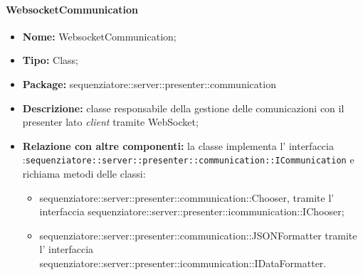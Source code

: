 \paragraph{WebsocketCommunication}
	\begin{itemize}
		\item \textbf{Nome:} WebsocketCommunication;
		\item \textbf{Tipo:} Class;
		\item \textbf{Package:} sequenziatore::server::presenter::communication
		\item \textbf{Descrizione:} classe responsabile della gestione delle comunicazioni con il presenter lato \textit{client} tramite WebSocket;
		\item \textbf{Relazione con altre componenti:} la classe implementa l' interfaccia :\texttt{sequenziatore::server::presenter::communication::ICommunication} e richiama metodi delle classi:
		\begin{itemize}
			\item sequenziatore::server::presenter::communication::Chooser, tramite l' interfaccia sequenziatore::server::presenter::icommunication::IChooser;
			\item sequenziatore::server::presenter::communication::JSONFormatter tramite l' interfaccia sequenziatore::server::presenter::icommunication::IDataFormatter.
		\end{itemize}
	\end{itemize}
